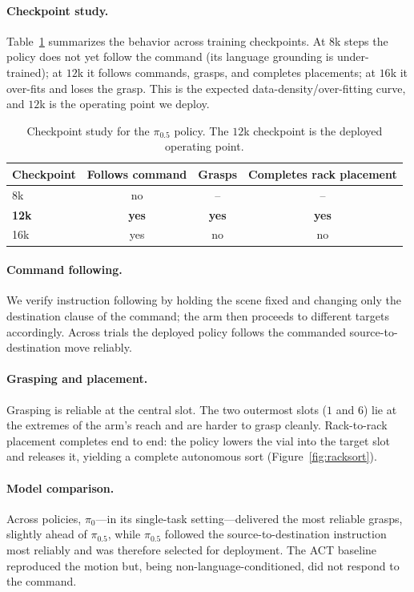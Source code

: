 \documentclass[11pt]{article}
\begin{document}
\paragraph{Checkpoint study.}
Table~\ref{tab:ckpt} summarizes the behavior across training checkpoints. At $8$k
steps the policy does not yet follow the command (its language grounding is
under-trained); at $12$k it follows commands, grasps, and completes placements; at
$16$k it over-fits and loses the grasp. This is the expected
data-density/over-fitting curve, and $12$k is the operating point we deploy.

\begin{table}[H]
  \centering
  \caption{Checkpoint study for the $\pi_{0.5}$ policy. The $12$k checkpoint is the
  deployed operating point.}
  \label{tab:ckpt}
  \begin{tabular}{lccc}
    \toprule
    \textbf{Checkpoint} & \textbf{Follows command} & \textbf{Grasps} & \textbf{Completes rack placement} \\
    \midrule
    8k   & no  & --  & -- \\
    \textbf{12k}  & \textbf{yes} & \textbf{yes} & \textbf{yes} \\
    16k  & yes & no  & no \\
    \bottomrule
  \end{tabular}
\end{table}

\paragraph{Command following.}
We verify instruction following by holding the scene fixed and changing only the
destination clause of the command; the arm then proceeds to different targets
accordingly. Across trials the deployed policy follows the commanded
source-to-destination move reliably.

\paragraph{Grasping and placement.}
Grasping is reliable at the central slot. The two outermost slots ($1$ and $6$) lie
at the extremes of the arm's reach and are harder to grasp cleanly. Rack-to-rack
placement completes end to end: the policy lowers the vial into the target slot and
releases it, yielding a complete autonomous sort (Figure~\ref{fig:racksort}).

\paragraph{Model comparison.}
Across policies, $\pi_0$---in its single-task setting---delivered the most reliable
grasps, slightly ahead of $\pi_{0.5}$, while
$\pi_{0.5}$ followed the source-to-destination instruction most reliably and was
therefore selected for deployment. The ACT baseline reproduced the motion but,
being non-language-conditioned, did not respond to the command.
\end{document}
